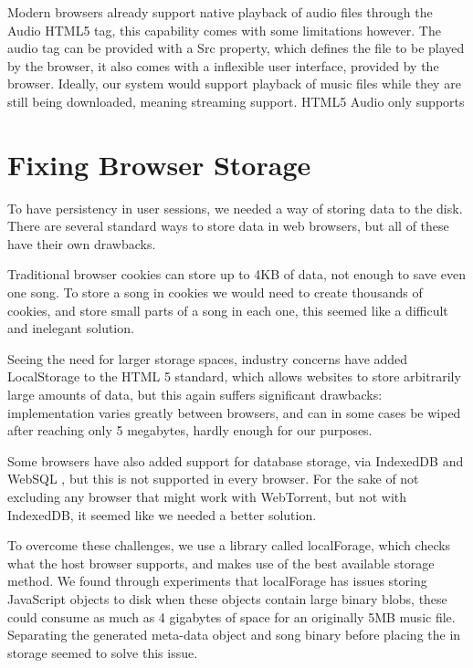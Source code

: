 

Modern browsers already support native playback of audio files through the Audio \acs{HTML}5 tag, 
this capability comes with some limitations however.
The audio tag can be provided with a Src property, which defines the file to be played by the browser,
it also comes with a inflexible user interface, provided by the browser.
Ideally, our system would support playback of music files while they are still being downloaded, 
meaning streaming support. 
\acs{HTML}5 Audio only supports 
\newline


\section{Fixing Browser Storage}
To have persistency in user sessions, we needed a way of storing data to the disk. There are several standard ways to store data in web browsers, but all of these have their own drawbacks.

Traditional browser cookies can store up to 4KB of data, 
not enough to save even one song. 
To store a song in cookies we would need to create thousands of cookies, 
and store small parts of a song in each one, 
this seemed like a difficult and inelegant solution.

Seeing the need for larger storage spaces, 
industry concerns have added LocalStorage to the \acs{HTML} 5 standard,
which allows websites to store arbitrarily large amounts of data,
but this again suffers significant drawbacks: 
implementation varies greatly between browsers, 
and can in some cases be wiped after reaching only 5 megabytes, 
hardly enough for our purposes.

Some browsers have also added support for database storage, via IndexedDB and WebSQL \citep{WebSQL}, 
but this is not supported in every browser. 
For the sake of not excluding any browser that might work with WebTorrent, but not with IndexedDB,
it seemed like we needed a better solution.
\newline

To overcome these challenges, we use a library called localForage, 
which checks what the host browser supports,
and makes use of the best available storage method.
We found through experiments
that localForage has issues storing JavaScript objects to disk when these objects contain large binary blobs, 
these could consume as much as 4 gigabytes of space for an originally 5MB music file.
Separating the generated meta-data object and song binary before placing the in storage
seemed to solve this issue.
\newline

